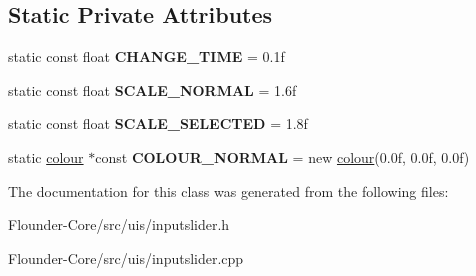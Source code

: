 \subsection*{Static Private Attributes}
\begin{DoxyCompactItemize}
\item 
\mbox{\label{classflounder_1_1inputslider_a95c103a84bc6ba6af9bd9fb5955b79f9}} 
static const float {\bfseries C\+H\+A\+N\+G\+E\+\_\+\+T\+I\+ME} = 0.\+1f
\item 
\mbox{\label{classflounder_1_1inputslider_ae4521d9820984ce5e233b7fcdf398606}} 
static const float {\bfseries S\+C\+A\+L\+E\+\_\+\+N\+O\+R\+M\+AL} = 1.\+6f
\item 
\mbox{\label{classflounder_1_1inputslider_aa37f8c17e01237ba7600489d23873105}} 
static const float {\bfseries S\+C\+A\+L\+E\+\_\+\+S\+E\+L\+E\+C\+T\+ED} = 1.\+8f
\item 
\mbox{\label{classflounder_1_1inputslider_a507f8833ed23ebd4eeb83406f7023593}} 
static \hyperlink{classflounder_1_1colour}{colour} $\ast$const {\bfseries C\+O\+L\+O\+U\+R\+\_\+\+N\+O\+R\+M\+AL} = new \hyperlink{classflounder_1_1colour}{colour}(0.\+0f, 0.\+0f, 0.\+0f)
\end{DoxyCompactItemize}


The documentation for this class was generated from the following files\+:\begin{DoxyCompactItemize}
\item 
Flounder-\/\+Core/src/uis/inputslider.\+h\item 
Flounder-\/\+Core/src/uis/inputslider.\+cpp\end{DoxyCompactItemize}
